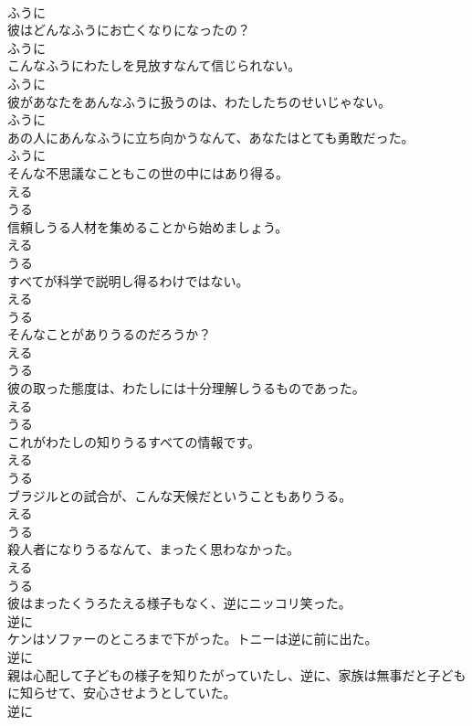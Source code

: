 \documentclass[8pt]{extreport}
\begin{document}
\begin{CJK}{UTF8}{min}
\\	ふうに	
\\	彼はどんなふうにお亡くなりになったの？	
\\	ふうに	
\\	こんなふうにわたしを見放すなんて信じられない。	
\\	ふうに	
\\	彼があなたをあんなふうに扱うのは、わたしたちのせいじゃない。	
\\	ふうに	
\\	あの人にあんなふうに立ち向かうなんて、あなたはとても勇敢だった。	
\\	ふうに	
\\	そんな不思議なこともこの世の中にはあり得る。	
\\	える 
\\	うる	
\\	信頼しうる人材を集めることから始めましょう。	
\\	える 
\\	うる	
\\	すべてが科学で説明し得るわけではない。	
\\	える 
\\	うる	
\\	そんなことがありうるのだろうか？	
\\	える 
\\	うる	
\\	彼の取った態度は、わたしには十分理解しうるものであった。	
\\	える 
\\	うる	
\\	これがわたしの知りうるすべての情報です。	
\\	える 
\\	うる	
\\	ブラジルとの試合が、こんな天候だということもありうる。	
\\	える 
\\	うる	
\\	殺人者になりうるなんて、まったく思わなかった。	
\\	える 
\\	うる	
\\	彼はまったくうろたえる様子もなく、逆にニッコリ笑った。	
\\	逆に	
\\	ケンはソファーのところまで下がった。トニーは逆に前に出た。	
\\	逆に	
\\	親は心配して子どもの様子を知りたがっていたし、逆に、家族は無事だと子どもに知らせて、安心させようとしていた。	
\\	逆に	

\end{CJK}
\end{document}
